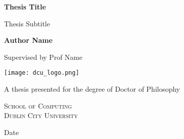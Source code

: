 \begin{titlepage}
    \begin{center}
        \vspace*{1cm}
        
        \Huge
        \textbf{Thesis Title}
        
        \vspace{0.5cm}
        
        \LARGE
        Thesis Subtitle
        
        \vspace{1.5cm}
        
        \Large
        \textbf{Author Name}\\
        
        \vspace{0.5cm}
        
        Supervised by Prof Name\\
        
        \vfill
        
        \texttt{[image: dcu\_logo.png]}
        
        \vspace{0.8cm}
        
        \Large
        A thesis presented for the degree of Doctor of Philosophy
        
        \vspace{0.5cm}
        
        \LARGE
	    \textsc{School of Computing\\
	    Dublin City University}
	    
	    \begin{flushright}
	
	    \Large
	    Date
	
	    \end{flushright}
        
    \end{center}
\end{titlepage}